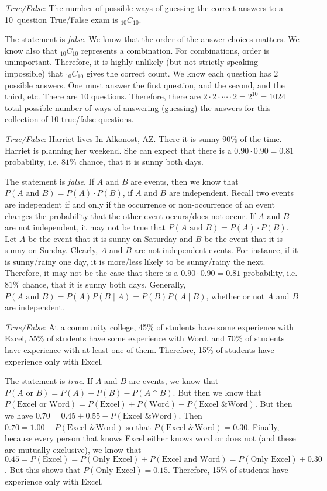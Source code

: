 \documentclass[11pt,letterpaper]{article}
\begin{document}
\quizsol \textit{True/False}: The number of possible ways of guessing the correct answers to a 10~question True/False exam is $_{10}C_{10}$. \pspace

\sol The statement is \textit{false}. We know that the order of the answer choices matters. We know also that $_{10}C_{10}$ represents a combination. For combinations, order is unimportant. Therefore, it is highly unlikely (but not strictly speaking impossible) that $_{10}C_{10}$ gives the correct count. We know each question has 2 possible answers. One must answer the first question, and the second, and the third, etc. There are 10 questions. Therefore, there are $2 \cdot 2 \cdot \cdots \cdot 2= 2^{10}= 1024$ total possible number of ways of answering (guessing) the answers for this collection of 10 true/false questions. \pvspace{1.3cm}



\quizsol \textit{True/False}: Harriet lives In Alkonost, AZ. There it is sunny 90\% of the time. Harriet is planning her weekend. She can expect that there is a $0.90 \cdot 0.90= 0.81$ probability, i.e. $81\%$ chance, that it is sunny both days. \pspace

\sol The statement is \textit{false}. If $A$ and $B$ are events, then we know that $P(A \text{ and } B)= P(A) \cdot P(B)$, if $A$ and $B$ are independent. Recall two events are independent if and only if the occurrence or non-occurrence of an event changes the probability that the other event occurs/does not occur. If $A$ and $B$ are not independent, it may not be true that $P(A \text{ and } B)= P(A) \cdot P(B)$. Let $A$ be the event that it is sunny on Saturday and $B$ be the event that it is sunny on Sunday. Clearly, $A$ and $B$ are not independent events. For instance, if it is sunny/rainy one day, it is more/less likely to be sunny/rainy the next. Therefore, it may not be the case that there is a $0.90 \cdot 0.90= 0.81$ probability, i.e. $81\%$ chance, that it is sunny both days. Generally, $P(A \text{ and } B)= P(A) P(B \;|\; A)= P(B) P(A \;|\; B)$, whether or not $A$ and $B$ are independent. \pvspace{1.3cm}



\quizsol \textit{True/False}: At a community college, 45\% of students have some experience with Excel, 55\% of students have some experience with Word, and 70\% of students have experience with at least one of them. Therefore, 15\% of students have experience only with Excel. \pspace

\sol The statement is \textit{true}. If $A$ and $B$ are events, we know that $P(A \text{ or } B)= P(A) + P(B) - P(A \cap B)$. But then we know that $P(\text{Excel or Word})= P(\text{Excel}) + P(\text{Word}) - P(\text{Excel \& Word})$. But then we have $0.70= 0.45 + 0.55 - P(\text{Excel \& Word})$. Then $0.70= 1.00 - P(\text{Excel \& Word})$ so that $P(\text{Excel \& Word})= 0.30$. Finally, because every person that knows Excel either knows word or does not (and these are mutually exclusive), we know that $0.45= P(\text{Excel})= P(\text{Only Excel}) + P(\text{Excel and Word})= P(\text{Only Excel}) + 0.30$. But this shows that $P(\text{Only Excel})= 0.15$. Therefore, 15\% of students have experience only with Excel. 
\end{document}
